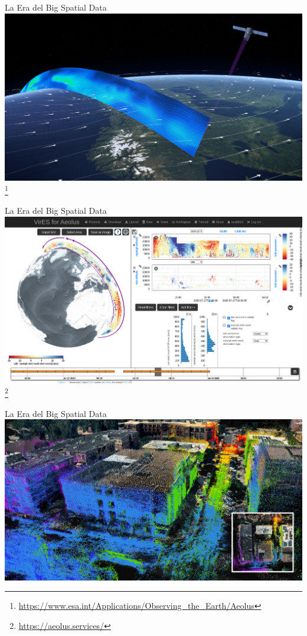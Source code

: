 \documentclass{beamer}
\newcommand\blfootnote[1]{%
  \begingroup
  \renewcommand\thefootnote{}\footnote{#1}%
  \addtocounter{footnote}{-1}%
  \endgroup
}
\begin{document}
\begin{frame}{La Era del Big Spatial Data}
  \centering
  \includegraphics[width=\textwidth]{figures/aeolus}
  \blfootnote{\url{https://www.esa.int/Applications/Observing_the_Earth/Aeolus}}
\end{frame}

\begin{frame}{La Era del Big Spatial Data}
  \centering
  \includegraphics[width=\textwidth]{figures/vires}
  \blfootnote{\url{https://aeolus.services/}}
\end{frame}

\begin{frame}{La Era del Big Spatial Data}
  \centering
  \includegraphics[width=\textwidth]{figures/lidar}
\end{frame}
\end{document}

